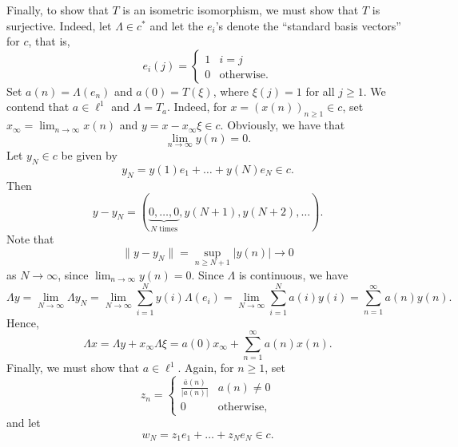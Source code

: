 \documentclass[10pt]{amsart}
\theoremstyle{thmstyle}
\theoremstyle{defstyle}
\renewcommand{\ge}{\geqslant}
\begin{document}
Finally, to show that $T$ is an isometric isomorphism, we must show that $T$ is surjective. Indeed, let $\Lambda\in c^\ast$ and let the $e_i$'s denote the ``standard basis vectors'' for $c$, that is, 
\begin{equation*}
	e_i(j) = 
	\begin{cases}
		1 & i = j\\
		0 & \text{otherwise}.
	\end{cases}
\end{equation*}
Set $a(n) = \Lambda(e_n)$ and $a(0) = T(\xi)$, where $\xi(j) = 1$ for all $j\ge 1$. We contend that $a\in\ell^1$ and $\Lambda = T_a$. Indeed, for $x = (x(n))_{n\ge 1}\in c$, set $x_\infty = \lim_{n\to\infty} x(n)$ and $y = x - x_\infty\xi\in c$. Obviously, we have that 
\begin{equation*}
	\lim_{n\to\infty} y(n) = 0.
\end{equation*}
Let $y_N\in c$ be given by 
\begin{equation*}
	y_N = y(1)e_1 + \dots + y(N)e_N\in c.
\end{equation*}
Then 
\begin{equation*}
	y - y_N = \left(\underbrace{0,\dots,0}_{N\text{ times}}, y(N + 1), y(N + 2),\dots\right).
\end{equation*}
Note that 
\begin{equation*}
	\|y - y_N\| = \sup_{n\ge N + 1}|y(n)|\to 0
\end{equation*}
as $N\to\infty$, since $\lim_{n\to\infty} y(n) = 0$. Since $\Lambda$ is continuous, we have 
\begin{equation*}
	\Lambda y = \lim_{N\to\infty}\Lambda y_N = \lim_{N\to\infty}\sum_{i = 1}^N y(i)\Lambda(e_i) = \lim_{N\to\infty}\sum_{i = 1}^N a(i)y(i) = \sum_{n = 1}^\infty a(n)y(n).
\end{equation*}
Hence, 
\begin{equation*}
	\Lambda x = \Lambda y + x_\infty\Lambda\xi = a(0)x_\infty + \sum_{n = 1}^\infty a(n)x(n).
\end{equation*}
Finally, we must show that $a\in\ell^1$. Again, for $n\ge 1$, set 
\begin{equation*}
	z_n = 
	\begin{cases}
		\frac{\overline a(n)}{|a(n)|} & a(n)\ne 0\\
		0 & \text{otherwise},
	\end{cases}
\end{equation*}
and let 
\begin{equation*}
	w_N = z_1e_1 + \dots + z_Ne_N\in c.
\end{equation*}
\end{document}
